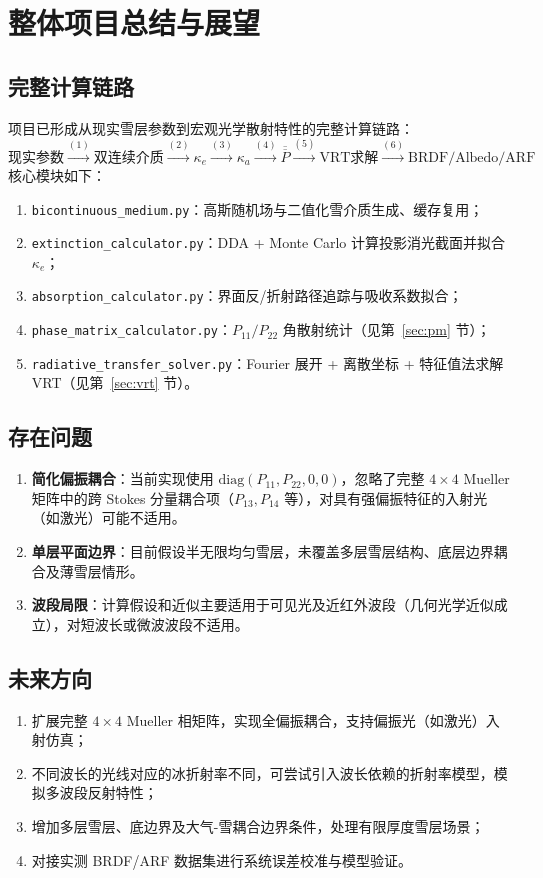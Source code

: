 \documentclass[UTF8,a4paper,12pt]{ctexart}
\begin{document}
\section{整体项目总结与展望}

\subsection{完整计算链路}

项目已形成从现实雪层参数到宏观光学散射特性的完整计算链路：
\[
  \text{现实参数}
  \xrightarrow{(1)}
  \text{双连续介质}
  \xrightarrow{(2)}
  \kappa_e
  \xrightarrow{(3)}
  \kappa_a
  \xrightarrow{(4)}
  \overline{\overline{P}}
  \xrightarrow{(5)}
  \text{VRT求解}
  \xrightarrow{(6)}
  \text{BRDF/Albedo/ARF}
\]
核心模块如下：
\begin{enumerate}[leftmargin=2em]
  \item \texttt{bicontinuous\_medium.py}：高斯随机场与二值化雪介质生成、缓存复用；
  \item \texttt{extinction\_calculator.py}：DDA + Monte Carlo 计算投影消光截面并拟合 $\kappa_e$；
  \item \texttt{absorption\_calculator.py}：界面反/折射路径追踪与吸收系数拟合；
  \item \texttt{phase\_matrix\_calculator.py}：$P_{11}/P_{22}$ 角散射统计（见第~\ref{sec:pm} 节）；
  \item \texttt{radiative\_transfer\_solver.py}：Fourier 展开 + 离散坐标 + 特征值法求解 VRT（见第~\ref{sec:vrt} 节）。
\end{enumerate}

\subsection{存在问题}

\begin{enumerate}[leftmargin=2em]
  \item \textbf{简化偏振耦合}：当前实现使用 $\mathrm{diag}(P_{11},P_{22},0,0)$，忽略了完整 $4\times4$ Mueller 矩阵中的跨 Stokes 分量耦合项（$P_{13},P_{14}$ 等），对具有强偏振特征的入射光（如激光）可能不适用。
  \item \textbf{单层平面边界}：目前假设半无限均匀雪层，未覆盖多层雪层结构、底层边界耦合及薄雪层情形。
  \item \textbf{波段局限}：计算假设和近似主要适用于可见光及近红外波段（几何光学近似成立），对短波长或微波波段不适用。
\end{enumerate}

\subsection{未来方向}

\begin{enumerate}[leftmargin=2em]
  \item 扩展完整 $4\times4$ Mueller 相矩阵，实现全偏振耦合，支持偏振光（如激光）入射仿真；
  \item 不同波长的光线对应的冰折射率不同，可尝试引入波长依赖的折射率模型，模拟多波段反射特性；
  \item 增加多层雪层、底边界及大气-雪耦合边界条件，处理有限厚度雪层场景；
  \item 对接实测 BRDF/ARF 数据集进行系统误差校准与模型验证。
\end{enumerate}
\end{document}
